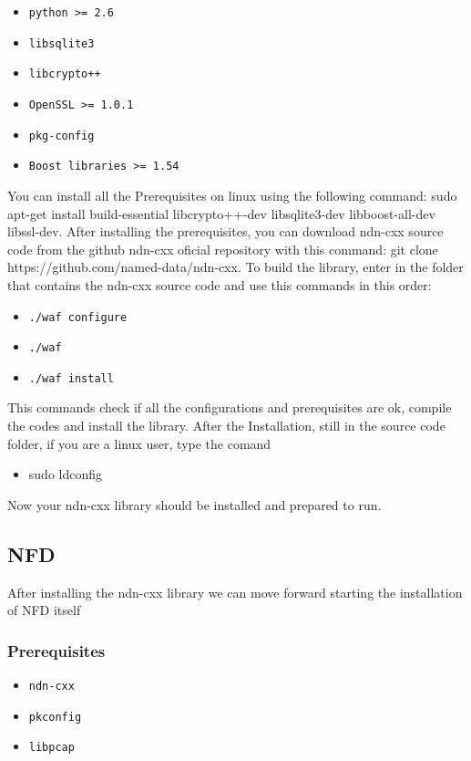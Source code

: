 \documentclass[11pt,conference]{./IEEEtran}
\begin{document}
	\begin{itemize}
		
           \item    \texttt{python >= 2.6 }
	   \item    \texttt{libsqlite3 }
       	   \item    \texttt{libcrypto++ }
	   \item    \texttt{OpenSSL >= 1.0.1 }
           \item    \texttt{pkg-config }
	   \item    \texttt{Boost libraries >= 1.54 }    
	\end{itemize} 
You can install all the Prerequisites on linux using the following command: sudo apt-get install build-essential libcrypto++-dev libsqlite3-dev libboost-all-dev libssl-dev. 
After installing the prerequisites, you can download ndn-cxx source code from the github ndn-cxx oficial repository with this command: git clone https://github.com/named-data/ndn-cxx.
To build the library, enter in the folder that contains the ndn-cxx source code and use this commands in this order:
\begin{itemize}
 \item \texttt{./waf configure} 
 \item \texttt{./waf}
 \item \texttt{./waf install}
\end{itemize}
This commands check if all the configurations and prerequisites are ok, compile the codes and install the library.
After the Installation, still in the source code folder, if you are a linux user, type the comand 
\begin{itemize}
 \item sudo ldconfig 
\end{itemize}
Now your ndn-cxx library should be installed and prepared to run.
	\subsection{NFD}  After installing the ndn-cxx library we can move forward starting the installation of NFD itself
	\subsubsection{Prerequisites}
	\begin{itemize}
		\item \texttt{ndn-cxx}
		
		\item \texttt{pkconfig}
		
		\item \texttt{libpcap}
		
	\end{itemize}
\end{document}
